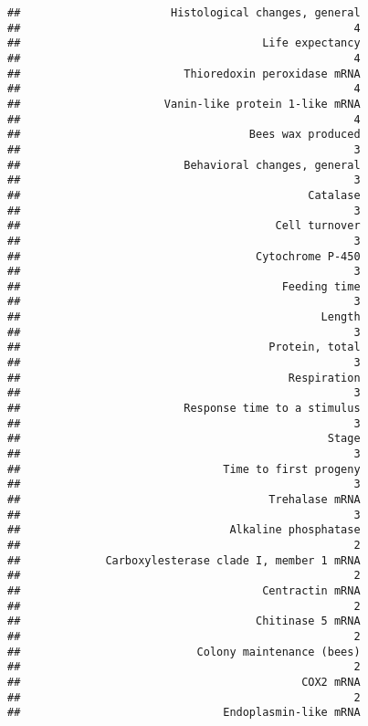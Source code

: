 \documentclass[]{article}
\begin{document}
\begin{verbatim}
##                       Histological changes, general 
##                                                   4 
##                                     Life expectancy 
##                                                   4 
##                         Thioredoxin peroxidase mRNA 
##                                                   4 
##                      Vanin-like protein 1-like mRNA 
##                                                   4 
##                                   Bees wax produced 
##                                                   3 
##                         Behavioral changes, general 
##                                                   3 
##                                            Catalase 
##                                                   3 
##                                       Cell turnover 
##                                                   3 
##                                    Cytochrome P-450 
##                                                   3 
##                                        Feeding time 
##                                                   3 
##                                              Length 
##                                                   3 
##                                      Protein, total 
##                                                   3 
##                                         Respiration 
##                                                   3 
##                         Response time to a stimulus 
##                                                   3 
##                                               Stage 
##                                                   3 
##                               Time to first progeny 
##                                                   3 
##                                      Trehalase mRNA 
##                                                   3 
##                                Alkaline phosphatase 
##                                                   2 
##             Carboxylesterase clade I, member 1 mRNA 
##                                                   2 
##                                     Centractin mRNA 
##                                                   2 
##                                    Chitinase 5 mRNA 
##                                                   2 
##                           Colony maintenance (bees) 
##                                                   2 
##                                           COX2 mRNA 
##                                                   2 
##                               Endoplasmin-like mRNA 

\end{verbatim}
\end{document}

